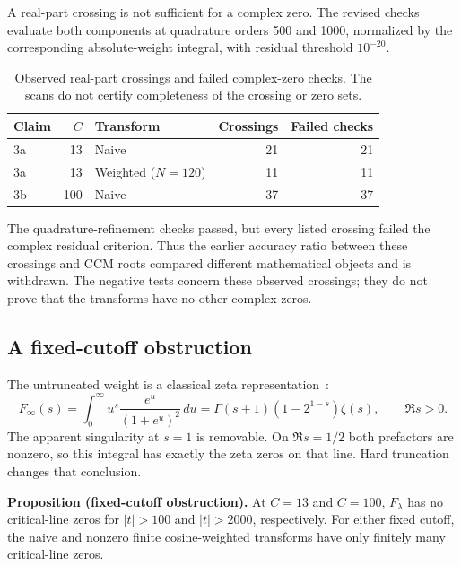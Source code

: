 \documentclass[11pt,a4paper]{article}
\begin{document}
A real-part crossing is not sufficient for a complex zero. The
revised checks evaluate both components at quadrature orders 500
and 1000, normalized by the corresponding absolute-weight integral,
with residual threshold $10^{-20}$.

\begin{table}[htbp]
\centering\small
\caption{Observed real-part crossings and failed complex-zero checks.
The scans do not certify completeness of the crossing or zero sets.}
\label{tab:crossings}
\begin{tabular}{@{}lrlrr@{}}
\toprule
Claim & $C$ & Transform & Crossings & Failed checks \\
\midrule
3a & 13 & Naive & 21 & 21 \\
3a & 13 & Weighted ($N=120$) & 11 & 11 \\
3b & 100 & Naive & 37 & 37 \\
\bottomrule
\end{tabular}
\end{table}

The quadrature-refinement checks passed, but every listed crossing
failed the complex residual criterion. Thus the earlier accuracy
ratio between these crossings and CCM roots compared different
mathematical objects and is withdrawn. The negative tests concern
these observed crossings; they do not prove that the transforms
have no other complex zeros.

\subsection*{A fixed-cutoff obstruction}

The untruncated weight is a classical zeta representation~\cite{DLMF}:
\begin{equation}
 F_\infty(s)=\int_0^\infty u^s\frac{e^u}{(1+e^u)^2}\,du
 =\Gamma(s+1)(1-2^{1-s})\zeta(s),\qquad \Re s>0.
 \label{eq:full-mellin}
\end{equation}
The apparent singularity at $s=1$ is removable. On $\Re s=1/2$ both prefactors
are nonzero, so this integral has exactly the zeta zeros on that line.
Hard truncation changes that conclusion.

\noindent\textbf{Proposition (fixed-cutoff obstruction).}
At $C=13$ and $C=100$, $F_\lambda$ has no critical-line zeros for
$|t|>100$ and $|t|>2000$, respectively. For either fixed cutoff,
the naive and nonzero finite cosine-weighted transforms have only
finitely many critical-line zeros.
\end{document}
